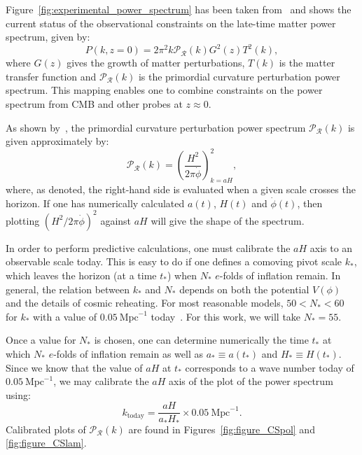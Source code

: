 Figure~\ref{fig:experimental_power_spectrum} has been taken from~\cite{hlozek_atacama_2012} and shows the current status of the observational constraints on the late-time matter power spectrum, given by:
%
\begin{equation}
  P(k,z=0) = 2\pi^2 k \mathcal{P}_\mathcal{R}(k) G^2(z) T^2(k),
\end{equation}
%
where \(G(z)\) gives the growth of matter perturbations, \(T(k)\) is the matter transfer function and \(\mathcal{P}_\mathcal{R}(k)\) is the primordial curvature perturbation power spectrum. This mapping enables one to combine constraints on the power spectrum from CMB and other probes at \(z\approx 0\).




As shown by~\cite{liddle_cosmological_2000}, the primordial curvature perturbation power spectrum \(\mathcal{P}_{\mathcal{R}}(k)\) is given approximately by:
%
\begin{equation}
  \mathcal{P}_{\mathcal{R}}(k)
  =
  {\left(\frac{H^2}{2\pi\dot{\phi}}\right)}^2_{k=a H},
  \label{eqn:curvature_power_spectrum}
\end{equation}
%
where, as denoted, the right-hand side is evaluated when a given scale crosses the horizon. If one has numerically calculated \(a(t)\), \(H(t)\) and \(\dot{\phi}(t)\), then plotting \({\left(H^2/ 2\pi\dot{\phi}\right)}^2\) against \(aH\) will give the shape of the spectrum.

In order to perform predictive calculations, one must calibrate the \(aH\) axis to an observable scale today. This is easy to do if one defines a comoving pivot scale \(k_*\), which leaves the horizon (at a time \(t_*\)) when \(N_*\) \(e\)-folds of inflation remain. In general, the relation between \(k_*\) and \(N_*\) depends on both the potential \(V(\phi)\) and the details of cosmic reheating. For most reasonable models, \(50<N_*<60\)  for \(k_*\) with a value of \(0.05\:\mathrm{Mpc}^{-1}\) today~\citep{planck_collaboration_planck_2013-1}. For this work, we will take \(N_*=55\). 

Once a value for \(N_*\) is chosen, one can determine numerically the time \(t_*\) at which \(N_*\) \(e\)-folds of inflation remain as well as \(a_*\equiv a(t_*)\) and \(H_*\equiv H(t_*)\). Since we know that the value of \(aH\) at \(t_*\) corresponds to a wave number today of \(0.05\:\mathrm{Mpc}^{-1}\), we may calibrate the \(aH\) axis of the plot of the power spectrum using:
%
\begin{equation}
  k_\mathrm{today} 
  = 
  \frac{aH}{a_*H_*}\times0.05\:\mathrm{Mpc}^{-1}.
\end{equation}
%
Calibrated plots of \(\mathcal{P}_\mathcal{R}(k)\) are found in Figures~\ref{fig:figure_CSpol} and \nolinebreak\ref{fig:figure_CSlam}. 



